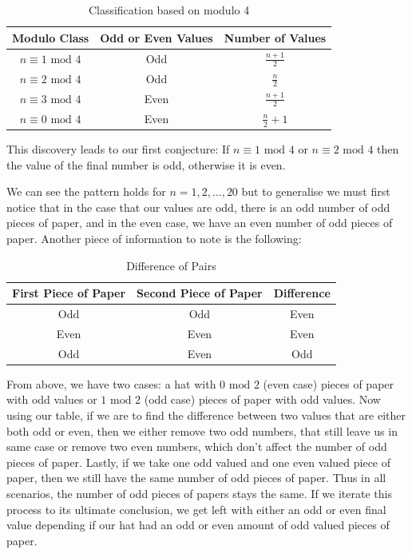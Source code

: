 \documentclass[11pt]{article}
\newcommand{\keywordfont}{\textsc}
\newcommand{\keyword}[1]{%
  \marginpar{\raggedright\small\keywordfont{#1}}}
\begin{document}
\begin{table}[h]
    \centering
    \begin{tabular}{c|c|c}
         Modulo Class&  Odd or Even Values&Number of Values\\
         \hline
         $n \equiv 1 \text{ mod } 4$&  Odd& $\frac{n + 1}{2}$\\
         $n \equiv 2 \text{ mod } 4$&  Odd&$\frac{n}{2}$\\
         $n \equiv 3 \text{ mod } 4$&  Even&$\frac{n + 1}{2}$\\
         $n \equiv 0 \text{ mod } 4$&  Even&$\frac{n}{2}+1$\\
    \end{tabular}
    \caption{Classification based on modulo 4}
    \label{tab:my_label}
\end{table}

This discovery leads to our first conjecture: \keyword{Conjecture} If $n \equiv 1 \text{ mod } 4$ or $n \equiv 2 \text{ mod } 4$ then the value of the final number is odd, otherwise it is even.
 
We can see the pattern holds for $n = 1,2,\dots,20$ \keyword{Justify} but to generalise we must first notice that in the case that our values are odd, there is an odd number of odd pieces of paper, and in the even case, we have an even number of odd pieces of paper. Another piece of information to note is the following:

\begin{table}
    \centering
    \begin{tabular}{c|c|c}
         First Piece of Paper &  Second Piece of Paper & Difference\\
         \hline
        Odd & Odd & Even\\
        Even & Even & Even\\
        Odd & Even & Odd\\
    \end{tabular}
    \caption{Difference of Pairs}
    \label{tab:my_label}
\end{table}

From above, we have two cases: a hat with $0 \text{ mod } 2$ (even case) pieces of paper with odd values or  $1 \text{ mod } 2$ (odd case) pieces of paper with odd values. Now using our table, if we are to find the difference between two values that are either both odd or even, then we either remove two odd numbers, that still leave us in same case or remove two even numbers, which don't affect the number of odd pieces of paper. Lastly, if we take one odd valued and one even valued piece of paper, then we still have the same number of odd pieces of paper. Thus in all scenarios, the number of odd pieces of papers stays the same. If we iterate this process to its ultimate conclusion, we get left with either an odd or even final value depending if our hat had an odd or even amount of odd valued pieces of paper. 
\end{document}
